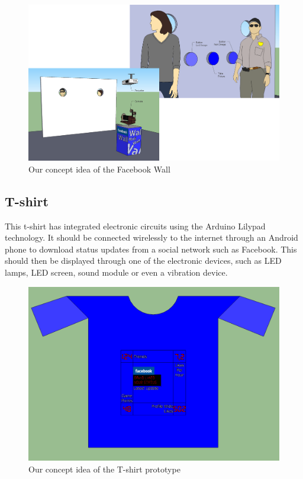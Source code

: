 \begin{figure}[h!]
\centering \includegraphics[scale=0.22]{img/prestudies-facebookwall} \caption{Our concept idea of the Facebook Wall}

\label{fig:prestudies-facebookwall}
\end{figure}

\subsection{T-shirt}
This t-shirt has integrated electronic circuits using the Arduino Lilypad technology. It should be connected wirelessly to
the internet through an Android phone to download status updates from a social network such as Facebook. This should
then be displayed through one of the electronic devices, such as LED lamps, LED screen, sound module or even a vibration
device.

\begin{figure}[h!]
\centering \includegraphics[scale=0.35]{img/prestudies-tshirt} \caption{Our concept idea of the T-shirt prototype}

\label{fig:prestudies-tshirt}
\end{figure}

